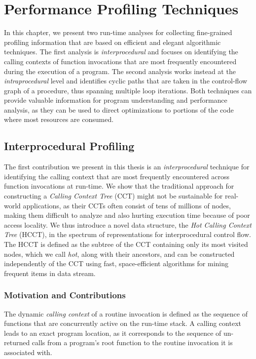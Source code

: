 \chapter{Performance Profiling Techniques}
\label{ch:profiling}

In this chapter, we present two run-time analyses for collecting fine-grained profiling information that are based on efficient and elegant algorithmic techniques. The first analysis is {\em interprocedural} and focuses on identifying the calling contexts of function invocations that are most frequently encountered during the execution of a program. The second analysis works instead at the {\em intraprocedural} level and identifies cyclic paths that are taken in the control-flow graph of a procedure, thus spanning multiple loop iterations. Both techniques can provide valuable information for program understanding and performance analysis, as they can be used to direct optimizations to portions of the code where most resources are consumed.

\section{Interprocedural Profiling}

The first contribution we present in this thesis is an {\em interprocedural} technique for identifying the calling context that are most frequently encountered across function invocations at run-time. We show that the traditional approach for constructing a {\em Calling Context Tree} (CCT) might not be sustainable for real-world applications, as their CCTs often consist of tens of millions of nodes, making them difficult to analyze and also hurting execution time because of poor access locality. We thus introduce a novel data structure, the {\em Hot Calling Context Tree} (HCCT), in the spectrum of representations for interprocedural control flow. The HCCT is defined as the subtree of the CCT containing only its most visited nodes, which we call {\em hot}, along with their ancestors, and can be constructed independently of the CCT using fast, space-efficient algorithms for mining frequent items in data stream.

\subsection{Motivation and Contributions}
The dynamic {\em calling context} of a routine invocation is defined as the sequence of functions that are concurrently active on the run-time stack. A calling context leads to an exact program location, as it corresponds to the sequence of un-returned calls from a program’s root function to the routine invocation it is associated with.

